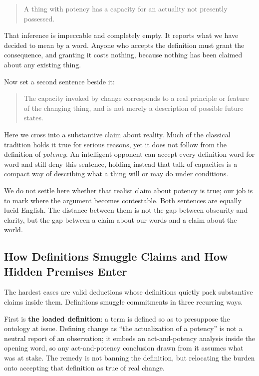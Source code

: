 \begin{quote}
A thing with potency has a capacity for an actuality not presently possessed.
\end{quote}

That inference is impeccable and completely empty. It reports what we have decided to mean by a word. Anyone who accepts the definition must grant the consequence, and granting it costs nothing, because nothing has been claimed about any existing thing.

Now set a second sentence beside it:

\begin{quote}
The capacity invoked by change corresponds to a real principle or feature of the changing thing, and is not merely a description of possible future states.
\end{quote}

Here we cross into a substantive claim about reality. Much of the classical tradition holds it true for serious reasons, yet it does not follow from the definition of \emph{potency}. An intelligent opponent can accept every definition word for word and still deny this sentence, holding instead that talk of capacities is a compact way of describing what a thing will or may do under conditions.

We do not settle here whether that realist claim about potency is true; our job is to mark where the argument becomes contestable. Both sentences are equally lucid English. The distance between them is not the gap between obscurity and clarity, but the gap between a claim about our words and a claim about the world.

\subsection{How Definitions Smuggle Claims and How Hidden Premises Enter}

The hardest cases are valid deductions whose definitions quietly pack substantive claims inside them. Definitions smuggle commitments in three recurring ways.

First is \textbf{the loaded definition}: a term is defined so as to presuppose the ontology at issue. Defining change as ``the actualization of a potency'' is not a neutral report of an observation; it embeds an act-and-potency analysis inside the opening word, so any act-and-potency conclusion drawn from it assumes what was at stake. The remedy is not banning the definition, but relocating the burden onto accepting that definition as true of real change.

